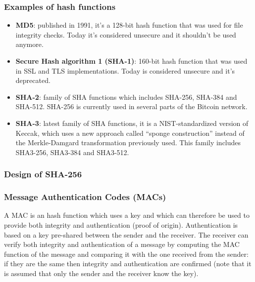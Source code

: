 \subsubsection{Examples of hash functions}
\begin{itemize}
  \item \textbf{MD5}: published in 1991, it's a 128-bit hash function that was
  used for file integrity checks. Today it's considered unsecure and it shouldn't
  be used anymore.
  \item \textbf{Secure Hash algorithm 1 (SHA-1)}: 160-bit hash function that was
  used in SSL and TLS implementations. Today is considered unsecure and it's
  deprecated.
  \item \textbf{SHA-2}: family of SHA functions which includes SHA-256, SHA-384
  and SHA-512. SHA-256 is currently used in several parts of the Bitcoin network.
  \item \textbf{SHA-3}: latest family of SHA functions, it is a NIST-standardized
  version of Keccak, which uses a new approach called ``sponge construction''
  instead of the Merkle-Damgard transformation previously used. This family
  includes SHA3-256, SHA3-384 and SHA3-512.
\end{itemize}

\subsubsection{Design of SHA-256}

\subsubsection{Message Authentication Codes (MACs)}
A MAC is an hash function which uses a key and which can therefore be used to
provide both integrity and authentication (proof of origin). Authentication is
based on a key pre-shared between the sender and the receiver. The receiver can
verify both integrity and authentication of a message by computing the MAC function
of the message and comparing it with the one received from the sender: if they are the
same then integrity and authentication are confirmed (note that it is assumed that
only the sender and the receiver know the key).

